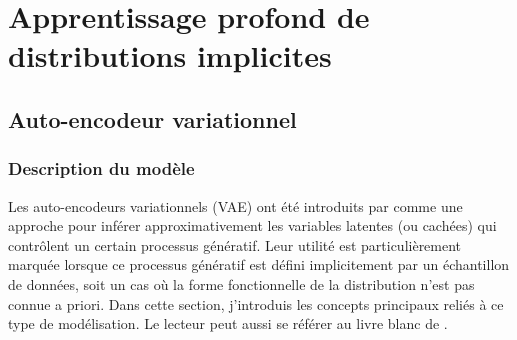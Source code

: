 \chapter{Apprentissage profond de distributions implicites}\label{chap:intro ml}

\section{Auto-encodeur variationnel}\label{sec:vae}
 
\subsection{Description du modèle}

Les auto-encodeurs variationnels (VAE) ont été introduits par \citet{Kingma2013} comme une approche 
pour inférer approximativement les variables latentes (ou cachées) qui contrôlent un certain processus génératif. 
Leur utilité est particulièrement marquée lorsque ce processus génératif est défini implicitement par un échantillon de données, 
soit un cas où la forme fonctionnelle de la distribution n'est pas connue a priori.
Dans cette section, j'introduis 
les concepts principaux reliés à ce type de modélisation. 
Le lecteur peut aussi se référer au livre blanc de \citet{Kingma2019}.

